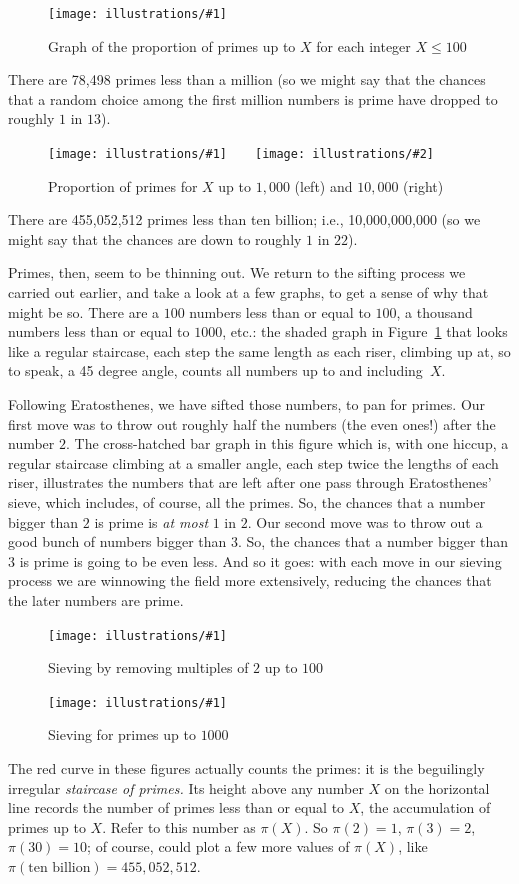 \documentclass[openany]{book}
\newcommand{\ill}[3]{%
   \begin{figure}[H]%
   \vspace{-2ex}
   \centering%
   \texttt{[image: illustrations/\#1]}%
   \caption{#3}%
   \vspace{-2ex}
    \end{figure}}
\newcommand{\illtwo}[4]{%
   \begin{figure}[H]\centering%
   \texttt{[image: illustrations/\#1]}$\qquad$\texttt{[image: illustrations/\#2]}%
   \caption{#4}%
    \end{figure}}
\theoremstyle{plain}
\theoremstyle{definition}
\begin{document}
\ill{proportion_primes_100}{1}{Graph of the proportion of primes up to $X$ for each integer $X\leq 100$}

There are 78,498 primes less than a million (so we might say that
the chances that a random choice among the first million numbers is
prime have dropped to roughly $1$ in $13$).

\illtwo{proportion_primes_1000}{proportion_primes_10000}{0.48}{Proportion of primes for $X$ up to $1,\!000$ (left) and $10,\!000$ (right)}

There are 455,052,512 primes less than ten billion; i.e.,
10,000,000,000 (so we might say that the chances are down to roughly
$1$ in $22$).

Primes, then, seem to be thinning out.  We return to the sifting process
we carried out earlier, and take a look at a few graphs, to get a sense of why
that might be so. There are a $100$ numbers less than or equal to
$100$, a thousand numbers less than or equal to $1000$, etc.: the
shaded graph in Figure~\ref{fig:sieve_2_100} that looks like a regular staircase, each step the
same length as each riser, climbing up at, so to speak, a 45 degree
angle, counts all numbers up to and including~$X$.

Following Eratosthenes, we have sifted those numbers, to pan for
primes. Our first move was to throw out roughly half the numbers (the
even ones!) after the number $2$. The cross-hatched bar graph in this
figure which is, with one hiccup, a regular staircase climbing at a
smaller angle, each step twice the lengths of each riser, illustrates
the numbers that are left after one pass through Eratosthenes' sieve,
which includes, of course, all the primes. So, the chances that a
number bigger than $2$ is prime is {\em at most} $1$ in $2$.  Our
second move was to throw out a good bunch of numbers bigger than $3$.
So, the chances that a number bigger than $3$ is prime is going to be
even less.  And so it goes: with each move in our
sieving process we are winnowing the field more extensively, reducing
the chances that the later numbers are prime.

\ill{sieve_2_100}{.8}{Sieving by removing multiples of $2$ up to $100$\label{fig:sieve_2_100}}
\ill{sieve1000}{.8}{Sieving for primes up to $1000$}
          
The red curve in these figures actually counts the primes: it is the
beguilingly irregular {\em staircase of primes.}  Its height above any
number $X$ on the horizontal line records the number of primes less
than or equal to $X$, the accumulation of primes up to $X$.  Refer to
this number as $\pi(X)$. So $\pi(2)=1$, $\pi(3) = 2$, $\pi(30) = 10$;
of course, could plot a few more values of $\pi(X)$, like
$\pi(\text{ten billion}) = 455,052,512$.
                              
\end{document}
